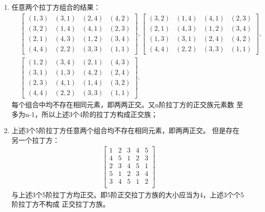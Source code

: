\begin{solution}
   \begin{enumerate}
      \item 任意两个拉丁方组合的结果：
      \begin{align*}&
         \left[\begin{matrix}
             (1,3)&(3,1)&(2,4)&(4,2)\\
             (3,2)&(1,4)&(4,1)&(2,3)\\
             (2,1)&(4,3)&(1,2)&(3,4)\\
             (4,4)&(2,2)&(3,3)&(1,1)
         \end{matrix}\right],
         \left[\begin{matrix}
             (3,2)&(1,4)&(4,1)&(2,3)\\
             (2,1)&(4,3)&(1,2)&(3,4)\\
             (1,3)&(3,1)&(2,4)&(4,2)\\
             (4,4)&(2,2)&(3,3)&(1,1)
         \end{matrix}\right],\\&
         \left[\begin{matrix}
            (1,2)&(3,4)&(2,1)&(4,3)\\
            (3,1)&(1,3)&(4,2)&(2,4)\\
            (2,3)&(4,1)&(1,4)&(3,2)\\
            (4,4)&(2,2)&(3,3)&(1,1)
        \end{matrix}\right].
     \end{align*}
     每个组合中均不存在相同元素，即两两正交。又n阶拉丁方的正交族元素数
     至多为n-1，所以上述3个4阶的拉丁方构成正交族；
     \item 上述3个5阶拉丁方任意两个组合均不存在相同元素，即两两正交。
     但是存在另一个拉丁方：
     \begin{align*}
      \left[\begin{matrix}
          1&2&3&4&5\\
          4&5&1&2&3\\
          2&3&4&5&1\\
          5&1&2&3&4\\
          3&4&5&1&2\\
         \end{matrix}\right]
      \end{align*}
      与上述3个5阶拉丁方均正交。即5阶正交拉丁方族的大小应当为4，上述3个个5阶拉丁方不构成
      正交拉丁方族。
   \end{enumerate}
\end{solution}